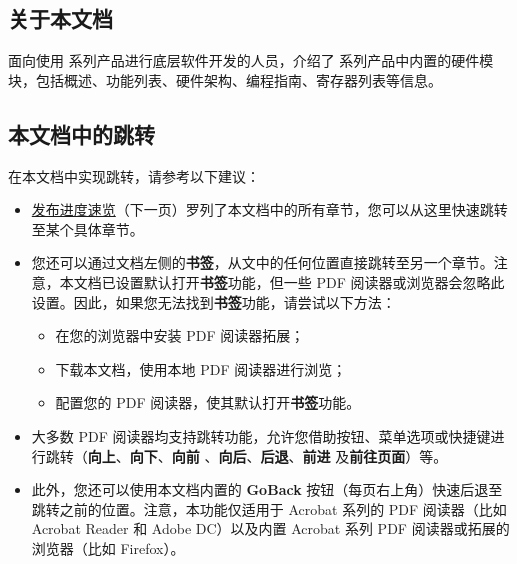\thispagestyle{empty}

\setcounter{page}{2}

\subsection*{关于本文档}



{\bfseries \chipname{} }面向使用 \chipname{} 系列产品进行底层软件开发的人员，介绍了 \chipname{} 系列产品中内置的硬件模块，包括概述、功能列表、硬件架构、编程指南、寄存器列表等信息。

\subsection*{本文档中的跳转}
在本文档中实现跳转，请参考以下建议：
\begin{itemize}
    \item \hyperref[tab:release-status]{发布进度速览}（下一页）罗列了本文档中的所有章节，您可以从这里快速跳转至某个具体章节。
    \item 您还可以通过文档左侧的\textbf{书签}，从文中的任何位置直接跳转至另一个章节。注意，本文档已设置默认打开\textbf{书签}功能，但一些 PDF 阅读器或浏览器会忽略此设置。因此，如果您无法找到\textbf{书签}功能，请尝试以下方法：
    \begin{itemize}
        \item 在您的浏览器中安装 PDF 阅读器拓展；
        \item 下载本文档，使用本地 PDF 阅读器进行浏览；
        \item 配置您的 PDF 阅读器，使其默认打开\textbf{书签}功能。
    \end{itemize}
    \item 大多数 PDF 阅读器均支持跳转功能，允许您借助按钮、菜单选项或快捷键进行跳转（\textbf{向上}、\textbf{向下}、\textbf{向前}
    、\textbf{向后}、\textbf{后退}、\textbf{前进}
    及\textbf{前往页面}）等。
    \item 此外，您还可以使用本文档内置的 \textbf{GoBack} 按钮（每页右上角）快速后退至跳转之前的位置。注意，本功能仅适用于 Acrobat 系列的 PDF 阅读器（比如 Acrobat Reader 和 Adobe DC）以及内置 Acrobat 系列 PDF 阅读器或拓展的浏览器（比如 Firefox）。
\end{itemize}
